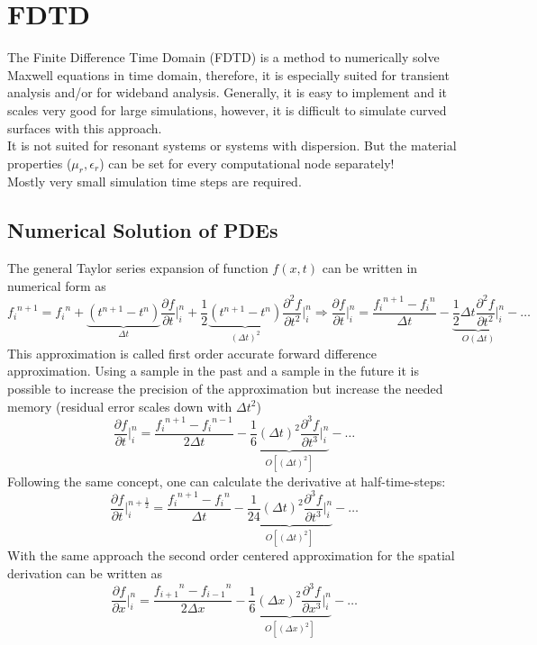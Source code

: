 \section{FDTD}
The Finite Difference Time Domain (FDTD) is a method to numerically solve Maxwell equations in time domain, therefore, it is especially suited for transient analysis and/or for wideband analysis. Generally, it is easy to implement and it scales very good for large simulations, however, it is difficult to simulate curved surfaces with this approach.\\
It is not suited for resonant systems or systems with dispersion. But the material properties ($\mu_r,\epsilon_r$) can be set for every computational node separately!\\ 
Mostly very small simulation time steps are required.

\subsection{Numerical Solution of PDEs}
The general Taylor series expansion of function $f(x,t)$ can be written in numerical form as 
\begin{equation*}
	{f_i}^{n+1}= {f_i}^n + \underbrace{\left(t^{n+1} - t^n\right)}_{\Delta t} \frac{\partial f}{\partial t} \bigg\rvert_{i}^{n} + \frac{1}{2} \underbrace{\left(t^{n+1} - t^n\right)}_{\left(\Delta t\right)^2} \frac{\partial^2f}{\partial t^2} \bigg\rvert_{i}^{n} \Rightarrow \frac{\partial f}{\partial t} \bigg\rvert_{i}^{n} = \frac{{f_i}^{n+1}-{f_i}^n}{\Delta t} - \underbrace{\frac{1}{2}\Delta t \frac{\partial ^2 f}{\partial t^2}\bigg\rvert_{i}^{n}}_{O(\Delta t)} - \dots
\end{equation*}
This approximation is called first order accurate forward difference approximation. \newline Using a sample in the past and a sample in the future it is possible to increase the precision of the approximation but increase the needed memory (residual error scales down with $\Delta t^2$)
\begin{equation*}
	\frac{\partial f}{\partial t} \bigg\rvert_{i}^{n} = \frac{{f_i}^{n+1}-{f_i}^{n-1}}{2\Delta t} - \underbrace{\frac{1}{6}\left(\Delta t\right)^2 \frac{\partial ^3 f}{\partial t^3}\bigg\rvert_{i}^{n}}_{O\left[(\Delta t)^2\right]} - \dots
\end{equation*}
Following the same concept, one can calculate the derivative at half-time-steps:
\begin{equation*}
	\frac{\partial f}{\partial t} \bigg\rvert_{i}^{n+\frac{1}{2}} = \frac{{f_i}^{n+1}-{f_i}^{n}}{\Delta t} - \underbrace{\frac{1}{24}\left(\Delta t\right)^2 \frac{\partial ^3 f}{\partial t^3}\bigg\rvert_{i}^{n}}_{O\left[(\Delta t)^2\right]} - \dots
\end{equation*}
With the same approach the second order centered approximation for the spatial derivation can be written as
\begin{equation*}
	\frac{\partial f}{\partial x} \bigg\rvert_{i}^{n} = \frac{{f_{i+1}}^{n}-{f_{i-1}}^{n}}{2\Delta x} - \underbrace{\frac{1}{6}\left(\Delta x\right)^2 \frac{\partial ^3 f}{\partial x^3}\bigg\rvert_{i}^{n}}_{O\left[(\Delta x)^2\right]} - \dots
\end{equation*}

